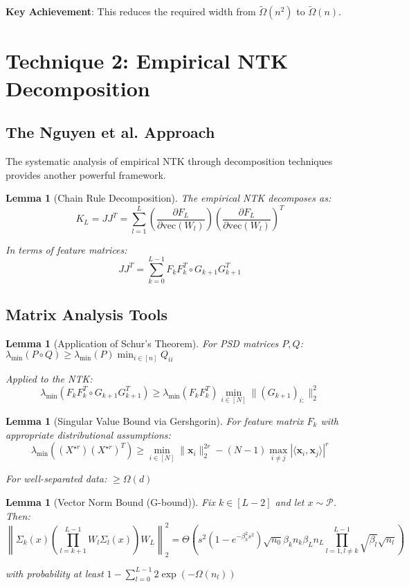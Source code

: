\documentclass{article}
\newtheorem{lemma}[theorem]{Lemma}
\newcommand{\evmin}[1]{\lambda_{\min}\left(#1\right)}
\newcommand{\x}{\mathbf{x}}
\newcommand{\bigOmg}{\Omega}
\newcommand{\bigTheta}{\Theta}
\newcommand{\TildeOmega}{\tilde{\Omega}}
\begin{document}
\textbf{Key Achievement}: This reduces the required width from $\TildeOmega(n^2)$ to $\TildeOmega(n)$.

\section{Technique 2: Empirical NTK Decomposition}

\subsection{The Nguyen et al. Approach}

The systematic analysis of empirical NTK through decomposition techniques provides another powerful framework.

\begin{lemma}[Chain Rule Decomposition]
The empirical NTK decomposes as:
$$K_L = JJ^T = \sum_{l=1}^L \left(\frac{\partial F_L}{\partial \text{vec}(W_l)}\right) \left(\frac{\partial F_L}{\partial \text{vec}(W_l)}\right)^T$$

In terms of feature matrices:
$$JJ^T = \sum_{k=0}^{L-1} F_k F_k^T \circ G_{k+1} G_{k+1}^T$$
\end{lemma}

\subsection{Matrix Analysis Tools}

\begin{lemma}[Application of Schur's Theorem]
For PSD matrices $P, Q$: $\evmin{P \circ Q} \geq \evmin{P} \min_{i \in [n]} Q_{ii}$

Applied to the NTK:
$$\evmin{F_k F_k^T \circ G_{k+1} G_{k+1}^T} \geq \evmin{F_k F_k^T} \min_{i \in [N]} \|(G_{k+1})_{i:}\|_2^2$$
\end{lemma}

\begin{lemma}[Singular Value Bound via Gershgorin]
For feature matrix $F_k$ with appropriate distributional assumptions:
$$\evmin{(X^{\star r})(X^{\star r})^T} \geq \min_{i \in [N]} \|\x_i\|_2^{2r} - (N-1) \max_{i \neq j} |\langle \x_i, \x_j \rangle|^r$$

For well-separated data: $\geq \Omega(d)$
\end{lemma}

\begin{lemma}[Vector Norm Bound (G-bound)]
Fix $k \in [L-2]$ and let $x \sim \mathcal{P}$. Then:
$$\left\|\Sigma_k(x)\left(\prod_{l=k+1}^{L-1}W_l\Sigma_l(x)\right)W_L\right\|_2^2 = \bigTheta\left(s^2(1 - e^{-\beta_k^2s^2})\sqrt{n_0}\beta_kn_k\beta_{L}n_L\prod_{l=1, l\neq k}^{L-1}\sqrt{\beta_l}\sqrt{n_l}\right)$$

with probability at least $1 - \sum_{l=0}^{L-1}2\exp(-\bigOmg(n_l))$
\end{lemma}
\end{document}
